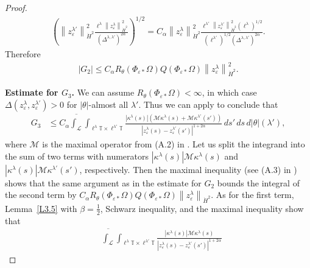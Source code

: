 \documentclass[reqno,centertags,12pt]{amsart}
\theoremstyle{definition}
\numberwithin{equation}{section}
\newcommand{\abs}[1]{\left\lvert#1\right\rvert}
\newcommand{\norm}[1]{\left\|#1\right\|}
\newcommand{\bbT}{{\mathbb{T}}}
\newcommand{\eps}{\varepsilon}
\newcommand{\tht}{\theta}
\begin{document}
\begin{proof}
\begin{align*}
        \left(
            \norm{z_{\eps}^{\lambda'}}_{\dot{H}^{2}}^{2}
            \frac{\ell^{\lambda}\norm{z_{\eps}^{\lambda}}_{\dot{H}^{2}}^{2}}
            {(\Delta^{\lambda,\lambda'})^{2\alpha}}
        \right)^{1/2}
        = C_{\alpha}\norm{z_{\eps}^{\lambda}}_{\dot{H}^{2}}^{2}
        \frac{\ell^{\lambda'}\norm{z_{\eps}^{\lambda'}}_{\dot{H}^{2}}^{2} 
        (\ell^{\lambda})^{1/2}}
        {(\ell^{\lambda'})^{1/2}(\Delta^{\lambda,\lambda'})^{2\alpha}}.
    \end{align*}
    Therefore
    \begin{align*}
        \abs{G_{2}} \leq C_{\alpha}R_{\tht}(\Phi_{\eps*}\Omega)
        Q(\Phi_{\eps*}\Omega)\norm{z_{\eps}^{\lambda}}_{\dot{H}^{2}}^{2}.
    \end{align*}

    \textbf{Estimate for $G_{3}$.} We can assume $R_{\tht}(\Phi_{\eps*}\Omega)<\infty$,
    in which case $\Delta(z_{\eps}^{\lambda},z_{\eps}^{\lambda'}) > 0$
    for $|\theta|$-almost all $\lambda'$.  Thus we can apply \cite[Lemma~A.4]{JeoZlaTouching}
    to conclude that
    \begin{align*}
        G_{3} &\leq C_{\alpha}\overline{\int_{\mathcal{L}}}
        \int_{\ell^{\lambda}\bbT\times \ell^{\lambda'}\bbT}
        \frac{\abs{\kappa^{\lambda}(s)}\left(
            \mathcal{M}\kappa^{\lambda}(s)
            + \mathcal{M}\kappa^{\lambda'}(s')
        \right)}
        {\abs{z_{\eps}^{\lambda}(s) - z_{\eps}^{\lambda'}(s')}^{1+2\alpha}}
        \,ds'\,ds\,d|\theta|(\lambda'),
    \end{align*}
    where $\mathcal{M}$ is the maximal operator from (A.2) in \cite{JeoZlaTouching}.
    Let us split the integrand into the sum of two terms with numerators
    $\abs{\kappa^{\lambda}(s)}\mathcal{M}\kappa^{\lambda}(s)$ and
    $\abs{\kappa^{\lambda}(s)}\mathcal{M}\kappa^{\lambda'}(s')$, respectively.  Then
     the maximal inequality (see (A.3) in \cite{JeoZlaTouching}) shows that  the same argument
    as in the estimate for $G_{2}$ bounds the integral of the second term by
    $C_{\alpha}R_{\tht}(\Phi_{\eps*}\Omega)Q(\Phi_{\eps*}\Omega)
    \norm{z_{\eps}^{\lambda}}_{\dot{H}^{2}}$.
    As for the first term, Lemma~\ref{L3.5} with $\beta=\frac 12$, Schwarz inequality, and
    the maximal inequality show that
    \begin{align*}
        &\overline{\int_{\mathcal{L}}}
        \int_{\ell^{\lambda}\bbT\times \ell^{\lambda'}\bbT}
        \frac{\abs{\kappa^{\lambda}(s)}\mathcal{M}\kappa^{\lambda}(s)}
        {\abs{z_{\eps}^{\lambda}(s) - z_{\eps}^{\lambda'}(s')}^{1+2\alpha}}

\end{align*}
\end{proof}
\end{document}
